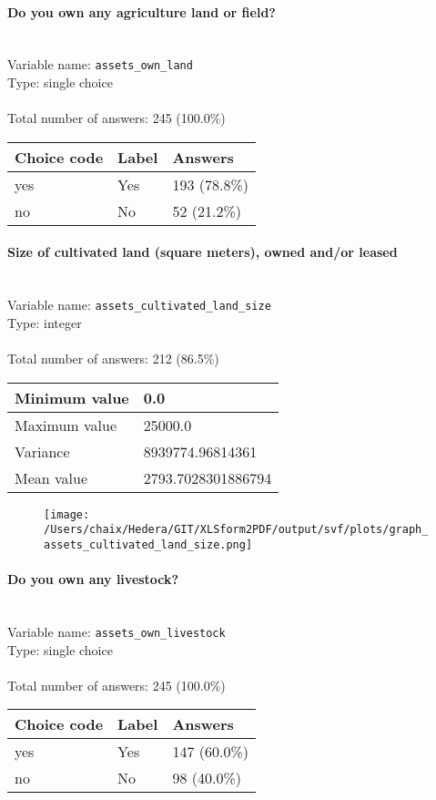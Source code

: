 \documentclass[11.5pt, a4paper]{scrartcl}
\begin{document}
\paragraph{Do you own any agriculture land or field?}
\  \\Variable name: \texttt{assets\_own\_land}\\
Type: single choice\\
\\Total number of answers: 245 (100.0\%)
\\[0.2em] \begin{tabular}{p{4cm}|p{8cm}|p{3cm}}
Choice code & Label & Answers \\
\hline
yes & Yes& \cellcolor{color3}193 (78.8\%)\\
\cellcolor{mygray} no & \cellcolor{mygray}No & \cellcolor{color1}52 (21.2\%)\\
\end{tabular}
\paragraph{Size of cultivated land (square meters), owned and/or leased}
\  \\Variable name: \texttt{assets\_cultivated\_land\_size}\\
Type: integer\\
\\Total number of answers: 212 (86.5\%)
\\[0.2em] \begin{tabular}{p{4cm}|p{8cm}}
Minimum value &0.0 \\
\hline
\cellcolor{mygray} Maximum value & \cellcolor{mygray}25000.0 \\
\hline
Variance &8939774.96814361 \\
\hline
\cellcolor{mygray} Mean value & \cellcolor{mygray}2793.7028301886794 \\
\hline
\end{tabular}
\begin{figure}[H]
\centering
\texttt{[image: /Users/chaix/Hedera/GIT/XLSform2PDF/output/svf/plots/graph\_assets\_cultivated\_land\_size.png]}
\end{figure}
\paragraph{Do you own any livestock?}
\  \\Variable name: \texttt{assets\_own\_livestock}\\
Type: single choice\\
\\Total number of answers: 245 (100.0\%)
\\[0.2em] \begin{tabular}{p{4cm}|p{8cm}|p{3cm}}
Choice code & Label & Answers \\
\hline
yes & Yes& \cellcolor{color2}147 (60.0\%)\\
\cellcolor{mygray} no & \cellcolor{mygray}No & \cellcolor{color1}98 (40.0\%)\\
\end{tabular}
\end{document}
